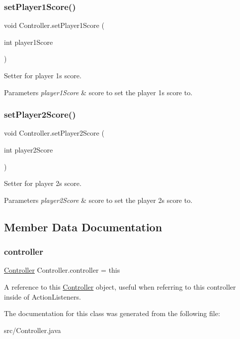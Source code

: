 \subsubsection{\texorpdfstring{set\+Player1\+Score()}{setPlayer1Score()}}
{\footnotesize\ttfamily void Controller.\+set\+Player1\+Score (\begin{DoxyParamCaption}\item[{int}]{player1\+Score }\end{DoxyParamCaption})}

Setter for player 1\textquotesingle{}s score. 
\begin{DoxyParams}{Parameters}
{\em player1\+Score} & score to set the player 1\textquotesingle{}s score to. \\
\hline
\end{DoxyParams}
\mbox{\label{class_controller_a3b3ac4a3190e42a00a11996b88a89989}} 
\subsubsection{\texorpdfstring{set\+Player2\+Score()}{setPlayer2Score()}}
{\footnotesize\ttfamily void Controller.\+set\+Player2\+Score (\begin{DoxyParamCaption}\item[{int}]{player2\+Score }\end{DoxyParamCaption})}

Setter for player 2\textquotesingle{}s score. 
\begin{DoxyParams}{Parameters}
{\em player2\+Score} & score to set the player 2\textquotesingle{}s score to. \\
\hline
\end{DoxyParams}


\subsection{Member Data Documentation}
\mbox{\label{class_controller_ac9eee5848fbbb6719d5cc24475fc03ae}} 
\subsubsection{\texorpdfstring{controller}{controller}}
{\footnotesize\ttfamily \mbox{\hyperlink{class_controller}{Controller}} Controller.\+controller = this}

A reference to this \mbox{\hyperlink{class_controller}{Controller}} object, useful when referring to this controller inside of Action\+Listeners. 

The documentation for this class was generated from the following file\+:\begin{DoxyCompactItemize}
\item 
src/Controller.\+java\end{DoxyCompactItemize}
